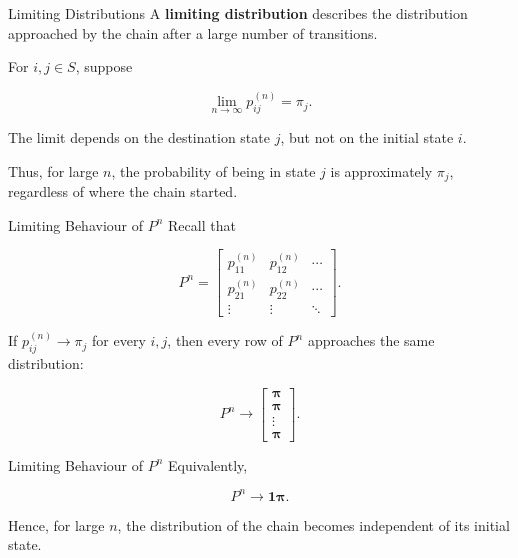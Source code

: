 \documentclass[
  ignorenonframetext,
  aspectratio=169,
]{beamer}
\begin{document}
\begin{frame}{Limiting Distributions}
\protect{}\label{limiting-distributions}
A \textbf{limiting distribution} describes the distribution approached
by the chain after a large number of transitions.

For \(i,j\in S\), suppose

\[
\boxed{
\lim_{n\rightarrow\infty}p_{ij}^{(n)}=\pi_j.
}
\]

The limit depends on the destination state \(j\), but not on the initial
state \(i\).

Thus, for large \(n\), the probability of being in state \(j\) is
approximately \(\pi_j\), regardless of where the chain started.
\end{frame}

\begin{frame}{Limiting Behaviour of \(P^n\)}
\protect{}\label{limiting-behaviour-of-pn}
Recall that

\[
P^n=
\begin{bmatrix}
p_{11}^{(n)}&p_{12}^{(n)}&\cdots\\
p_{21}^{(n)}&p_{22}^{(n)}&\cdots\\
\vdots&\vdots&\ddots
\end{bmatrix}.
\]

If \(p_{ij}^{(n)}\longrightarrow\pi_j\) for every \(i,j\), then every
row of \(P^n\) approaches the same distribution:

\[
\boxed{
P^n
\longrightarrow
\begin{bmatrix}
\boldsymbol{\pi}\\
\boldsymbol{\pi}\\
\vdots\\
\boldsymbol{\pi}
\end{bmatrix}.
}
\]
\end{frame}

\begin{frame}{Limiting Behaviour of \(P^n\)}
\protect{}\label{limiting-behaviour-of-pn-1}
Equivalently,

\[
\boxed{
P^n\longrightarrow\boldsymbol{1}\boldsymbol{\pi}.
}
\]

Hence, for large \(n\), the distribution of the chain becomes
independent of its initial state.
\end{frame}
\end{document}
